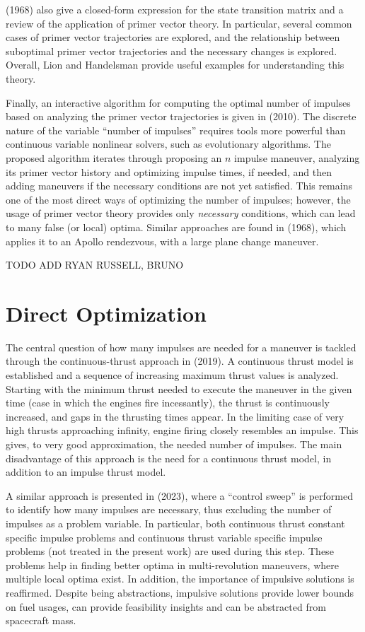 \citeauthor{fixed_time_primer_vector} (1968) also give a closed-form expression for the state transition matrix and a review of the application of primer vector theory. In particular, several common cases of primer vector trajectories are explored, and the relationship between suboptimal primer vector trajectories and the necessary changes is explored. Overall, Lion and Handelsman provide useful examples for understanding this theory. 

Finally, an interactive algorithm for computing the optimal number of impulses based on analyzing the primer vector trajectories is given in \citeauthor{interactive_primer_vector} (2010). The discrete nature of the variable ``number of impulses'' requires tools more powerful than continuous variable nonlinear solvers, such as evolutionary algorithms. The proposed algorithm iterates through proposing an \(n\) impulse maneuver, analyzing its primer vector history and optimizing impulse times, if needed, and then adding maneuvers if the necessary conditions are not yet satisfied. This remains one of the most direct ways of optimizing the number of impulses; however, the usage of primer vector theory provides only \textit{necessary} conditions, which can lead to many false (or local) optima. Similar approaches are found in \citeauthor{efficient_n_impulse} (1968), which applies it to an Apollo rendezvous, with a large plane change maneuver.

TODO ADD RYAN RUSSELL, BRUNO

\section{Direct Optimization}

The central question of how many impulses are needed for a maneuver is tackled through the continuous-thrust approach in \citeauthor{how_many_impulses} (2019). A continuous thrust model is established and a sequence of increasing maximum thrust values is analyzed. Starting with the minimum thrust needed to execute the maneuver in the given time (case in which the engines fire incessantly), the thrust is continuously increased, and gaps in the thrusting times appear. In the limiting case of very high thrusts approaching infinity, engine firing closely resembles an impulse. This gives, to very good approximation, the needed number of impulses. The main disadvantage of this approach is the need for a continuous thrust model, in addition to an impulse thrust model. 

A similar approach is presented in \citeauthor{mult_rev_many_imp} (2023), where a ``control sweep'' is performed to identify how many impulses are necessary, thus excluding the number of impulses as a problem variable. In particular, both continuous thrust constant specific impulse problems and continuous thrust variable specific impulse problems (not treated in the present work) are used during this step. These problems help in finding better optima in multi-revolution maneuvers, where multiple local optima exist. In addition, the importance of impulsive solutions is reaffirmed. Despite being abstractions, impulsive solutions provide lower bounds on fuel usages, can provide feasibility insights and can be abstracted from spacecraft mass.

